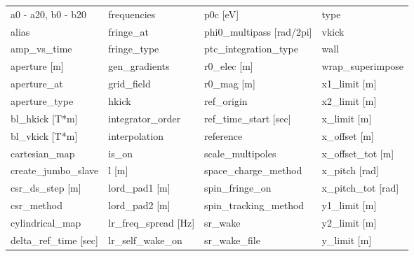  \begin{tabular}{llll} \toprule
a0 - a20, b0 - b20               & frequencies                      & p0c [eV]                         & type                             \\
alias                            & fringe_at                        & phi0_multipass [rad/2pi]         & vkick                            \\
amp_vs_time                      & fringe_type                      & ptc_integration_type             & wall                             \\
aperture [m]                     & gen_gradients                    & r0_elec [m]                      & wrap_superimpose                 \\
aperture_at                      & grid_field                       & r0_mag [m]                       & x1_limit [m]                     \\
aperture_type                    & hkick                            & ref_origin                       & x2_limit [m]                     \\
bl_hkick [T*m]                   & integrator_order                 & ref_time_start [sec]             & x_limit [m]                      \\
bl_vkick [T*m]                   & interpolation                    & reference                        & x_offset [m]                     \\
cartesian_map                    & is_on                            & scale_multipoles                 & x_offset_tot [m]                 \\
create_jumbo_slave               & l [m]                            & space_charge_method              & x_pitch [rad]                    \\
csr_ds_step [m]                  & lord_pad1 [m]                    & spin_fringe_on                   & x_pitch_tot [rad]                \\
csr_method                       & lord_pad2 [m]                    & spin_tracking_method             & y1_limit [m]                     \\
cylindrical_map                  & lr_freq_spread [Hz]              & sr_wake                          & y2_limit [m]                     \\
delta_ref_time [sec]             & lr_self_wake_on                  & sr_wake_file                     & y_limit [m]                      \\

\end{tabular}
